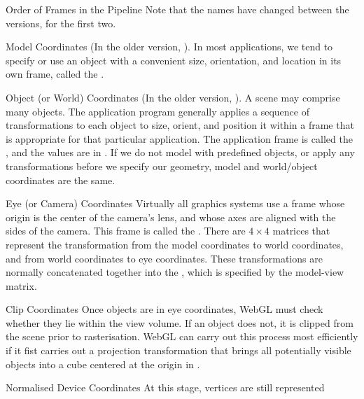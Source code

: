 \documentclass[../COS3712_Notes.tex]{subfiles}
\begin{document}
      \begin{sidenote}{Order of Frames in the Pipeline}
        Note that the names have changed between the versions, for the first two.

        \begin{descriptenum}
          \item[Model Coordinates] (In the older version, ).
            In most applications, we tend to specify or use
            an object with a convenient size, orientation, and location in its own frame,
            called the .
          \item[Object (or World) Coordinates] (In the older version,
            ).
            A scene may comprise many objects.
            The application program generally applies a sequence of transformations to each object
            to size, orient, and position it within a frame that is appropriate for that particular
            application.
            The application frame is called the ,
            and the values are in .
            If we do not model with predefined objects, or apply any transformations before
            we specify our geometry, model and world/object coordinates are the same.
          \item[Eye (or Camera) Coordinates] Virtually all graphics systems use a frame
            whose origin is the center of the camera's lens, and whose axes are aligned
            with the sides of the camera.
            This frame is called the .
            There are $4 \times 4$ matrices that represent the transformation from the
            model coordinates to world coordinates, and from world coordinates to eye coordinates.
            These transformations are normally concatenated together into the
            , which is specified by the model-view matrix.
          \item[Clip Coordinates] Once objects are in eye coordinates, WebGL must check whether
            they lie within the view volume.
            If an object does not, it is clipped from the scene prior to rasterisation.
            WebGL can carry out this process most efficiently if it fist carries out a projection
            transformation that brings all potentially visible objects into a cube centered
            at the origin in .
          \item[Normalised Device Coordinates] At this stage, vertices are still represented

\end{descriptenum}
\end{sidenote}
\end{document}
